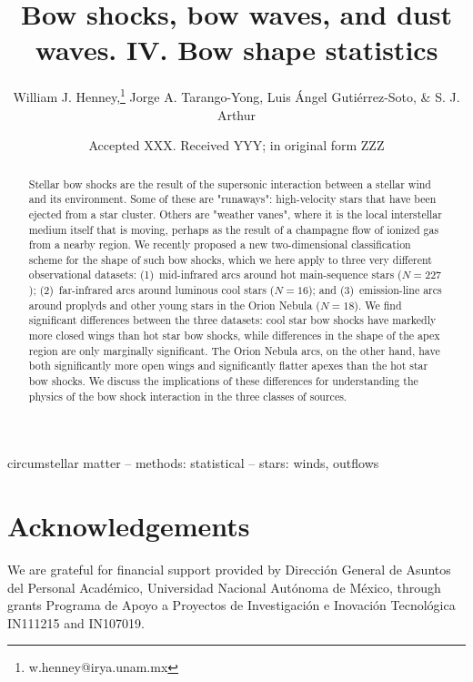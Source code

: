 \documentclass[useAMS, usenatbib, a4paper]{mnras}
\title[Bow shocks, bow waves, and dust waves. IV.]{Bow shocks, bow
  waves, and dust waves. IV. Bow shape statistics}
\author[Henney et al.]{
  William J. Henney,\thanks{w.henney@irya.unam.mx}
  Jorge A. Tarango-Yong,
  Luis \'Angel Guti\'errez-Soto,
  \& S. J. Arthur
  \\
  \AddressCRyA
}
\date{Accepted XXX. Received YYY; in original form ZZZ}
\begin{document}
\label{firstpage}
\pagerange{\pageref{firstpage}--\pageref{lastpage}}
\maketitle
\begin{abstract}
  Stellar bow shocks are the result of the supersonic interaction
  between a stellar wind and its environment.  Some of these are
  "runaways": high-velocity stars that have been ejected from a star
  cluster.  Others are "weather vanes", where it is the local
  interstellar medium itself that is moving, perhaps as the result of
  a champagne flow of ionized gas from a nearby \hii{} region.
  We recently proposed a new two-dimensional classification scheme for
  the shape of such bow shocks, which we here apply to three very
  different observational datasets: (1)~mid-infrared arcs
  around hot main-sequence stars (\(N = 227\)); (2)~far-infrared arcs
  around luminous cool stars (\(N = 16\)); and (3)~emission-line arcs
  around proplyds and other young stars in the Orion Nebula
  (\(N = 18\)).  We find significant differences between the three
  datasets: cool star bow shocks have markedly more closed wings than
  hot star bow shocks, while differences in the shape of the apex
  region are only marginally significant.  The Orion Nebula arcs, on
  the other hand, have both significantly more open wings and
  significantly flatter apexes than the hot star bow shocks.  We
  discuss the implications of these differences for understanding the
  physics of the bow shock interaction in the three classes of
  sources.
\end{abstract}

\begin{keywords}
  circumstellar matter -- methods: statistical -- stars: winds, outflows
\end{keywords}






\section*{Acknowledgements}
We are grateful for financial support provided by Dirección General de
Asuntos del Personal Académico, Universidad Nacional Autónoma de
México, through grants Programa de Apoyo a Proyectos de Investigación
e Inovación Tecnológica IN111215 and IN107019.  



\appendix


\bsp	%
\label{lastpage}
\end{document}
